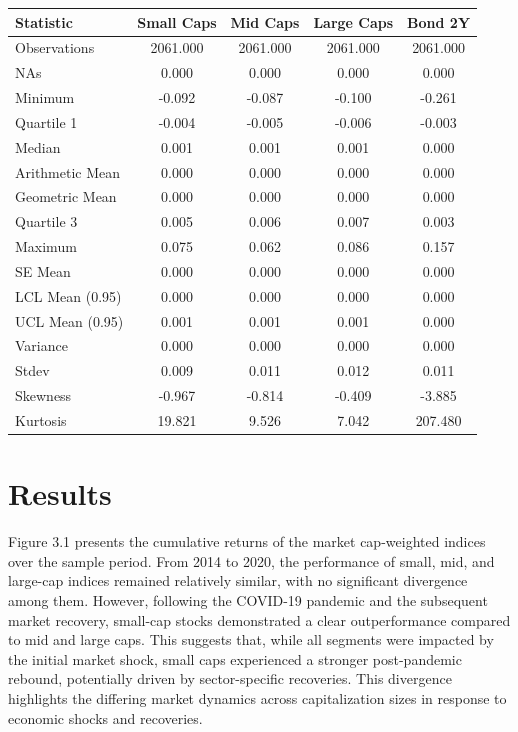 \documentclass[12pt,preprint]{elsarticle}
\let\origtable\table
\let\endorigtable\endtable
\renewenvironment{table}[1][2] {
    \expandafter\origtable\expandafter[H]
} {
    \endorigtable
}
\numberwithin{equation}{section}
\numberwithin{figure}{section}
\numberwithin{table}{section}
\begin{document}
\begin{table}[H]
    \centering
    \caption{Descriptive Statistics for Market Cap Indices and Bond Yields}
    \label{tab:tablestats}
    \begin{tabular}{lcccc}
        \hline
        Statistic & Small Caps & Mid Caps & Large Caps & Bond 2Y \\
        \hline
        Observations & 2061.000 & 2061.000 & 2061.000 & 2061.000 \\
        NAs & 0.000 & 0.000 & 0.000 & 0.000 \\
        Minimum & -0.092 & -0.087 & -0.100 & -0.261 \\
        Quartile 1 & -0.004 & -0.005 & -0.006 & -0.003 \\
        Median & 0.001 & 0.001 & 0.001 & 0.000 \\
        Arithmetic Mean & 0.000 & 0.000 & 0.000 & 0.000 \\
        Geometric Mean & 0.000 & 0.000 & 0.000 & 0.000 \\
        Quartile 3 & 0.005 & 0.006 & 0.007 & 0.003 \\
        Maximum & 0.075 & 0.062 & 0.086 & 0.157 \\
        SE Mean & 0.000 & 0.000 & 0.000 & 0.000 \\
        LCL Mean (0.95) & 0.000 & 0.000 & 0.000 & 0.000 \\
        UCL Mean (0.95) & 0.001 & 0.001 & 0.001 & 0.000 \\
        Variance & 0.000 & 0.000 & 0.000 & 0.000 \\
        Stdev & 0.009 & 0.011 & 0.012 & 0.011 \\
        Skewness & -0.967 & -0.814 & -0.409 & -3.885 \\
        Kurtosis & 19.821 & 9.526 & 7.042 & 207.480 \\
        \hline
    \end{tabular}
\end{table}

\section{Results}\label{results}

Figure 3.1 presents the cumulative returns of the market cap-weighted
indices over the sample period. From 2014 to 2020, the performance of
small, mid, and large-cap indices remained relatively similar, with no
significant divergence among them. However, following the COVID-19
pandemic and the subsequent market recovery, small-cap stocks
demonstrated a clear outperformance compared to mid and large caps. This
suggests that, while all segments were impacted by the initial market
shock, small caps experienced a stronger post-pandemic rebound,
potentially driven by sector-specific recoveries. This divergence
highlights the differing market dynamics across capitalization sizes in
response to economic shocks and recoveries.
\end{document}
